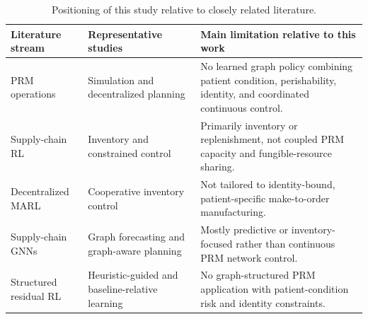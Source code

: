 \documentclass[preprint,review,12pt]{elsarticle}
\begin{document}
\begin{table}[htbp]
\centering
\footnotesize
\caption{Positioning of this study relative to closely related literature.}
\label{tab:lit_positioning}
\setlength{\tabcolsep}{3pt}
\renewcommand{\arraystretch}{1.0}
\begin{tabularx}{\textwidth}{p{} p{} X}
\toprule
Literature stream & Representative studies & Main limitation relative to this work \\
\midrule
PRM operations & Simulation and decentralized planning~\cite{Wang2023SimulationBased,Li2023,Tseng2023DeepRL} & No learned graph policy combining patient condition, perishability, identity, and coordinated continuous control. \\
Supply-chain RL & Inventory and constrained control~\cite{Oroojlooyjadid2022BeerGame,Bermudez2023DCPO,Stranieri2025PharmaDRL,Eisenach2024NeuralCoordination} & Primarily inventory or replenishment, not coupled PRM capacity and fungible-resource sharing. \\
Decentralized MARL & Cooperative inventory control~\cite{Mousa2023DecInvMARL,Leluc2023MARLIM} & Not tailored to identity-bound, patient-specific make-to-order manufacturing. \\
Supply-chain GNNs & Graph forecasting and graph-aware planning~\cite{Chang2025AAAI,Ahn2024GSP,Ahn2024GPP,Kotecha2025GNNMARL} & Mostly predictive or inventory-focused rather than continuous PRM network control. \\
Structured residual RL & Heuristic-guided and baseline-relative learning~\cite{DeMoor2022RewardShaping,Staessens2022ConstrainedResidual,Metelli2021SafePolicyIteration,Temizoz2025DeepControlledLearning} & No graph-structured PRM application with patient-condition risk and identity constraints. \\
\bottomrule
\end{tabularx}
\end{table}
\end{document}
